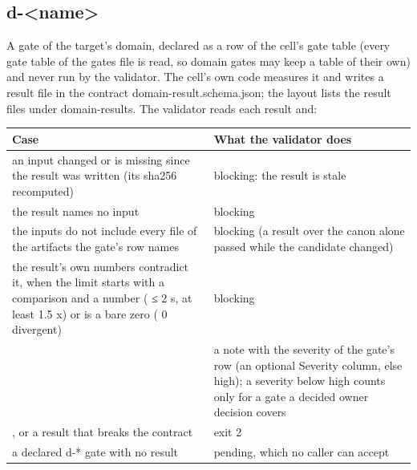 \documentclass[
  american,
  10pt,
]{report}
\newcounter{none} %
\renewcommand{\texttt}[1]{{\ttfamily\hyphenchar\font=-1 #1}}
\begin{document}
\subsection{\texorpdfstring{\texttt{d-\allowbreak{}<name>}}{}}\label{d-name}

A gate of the target's domain, declared as a row of the cell's gate
table (every gate table of the gates file is read, so domain gates may
keep a table of their own) and never run by the validator. The cell's
own code measures it and writes a result file in the contract
\texttt{domain-\allowbreak{}result.\allowbreak{}schema.\allowbreak{}json};
the layout lists the result files under
\texttt{domain-\allowbreak{}results}. The validator reads each result
and:

{\def\LTcaptype{none} %
\begin{longtable}[]{@{}
  >{\raggedright\arraybackslash}p{}
  >{\raggedright\arraybackslash}p{}@{}}
\toprule\noalign{}
\begin{minipage}[b]{\linewidth}\raggedright
Case
\end{minipage} & \begin{minipage}[b]{\linewidth}\raggedright
What the validator does
\end{minipage} \\
\midrule\noalign{}
\endhead
\bottomrule\noalign{}
\endlastfoot
an input changed or is missing since the result was written (its sha256
recomputed) & blocking: the result is stale \\
the result names no input & blocking \\
the inputs do not include every file of the artifacts the gate's row
names & blocking (a result over the canon alone passed while the
candidate changed) \\
the result's own numbers contradict it, when the limit starts with a
comparison and a number (\texttt{≤ 2 s},
\texttt{at least 1.\allowbreak{}5 x}) or is a bare zero
(\texttt{0 divergent}) & blocking \\
\texttt{result:\allowbreak{} fail} & a note with the severity of the
gate's row (an optional Severity column, else high); a severity below
high counts only for a gate a decided owner decision covers \\
\texttt{result:\allowbreak{} tool-\allowbreak{}failure}, or a result
that breaks the contract & exit 2 \\
a declared \texttt{d-\allowbreak{}*} gate with no result & pending,
which no caller can accept \\
\end{longtable}
}
\end{document}
